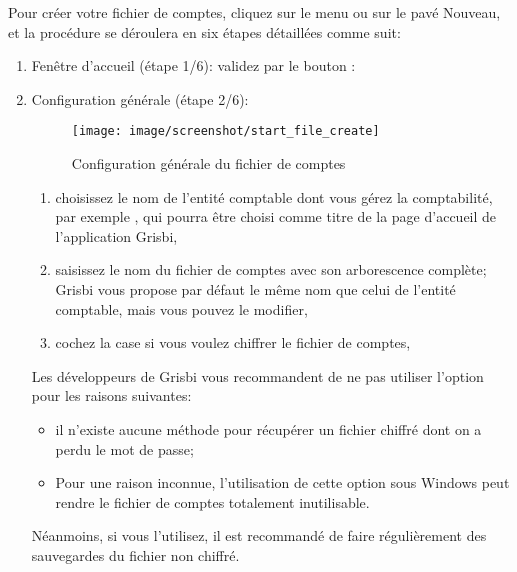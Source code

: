 Pour créer votre fichier de comptes, cliquez sur le menu  ou sur le pavé Nouveau, et la procédure se déroulera en six étapes détaillées comme suit:

\begin{enumerate}
	\item Fenêtre d'accueil (étape 1/6): validez par le bouton :
	\item Configuration
 générale (étape 2/6):

\begin{figure}[htbp]
\begin{center}
\texttt{[image: image/screenshot/start\_file\_create]}
\end{center}
\caption{Configuration générale du fichier de comptes}
\label{start_file_create}
\end{figure}
		
		\begin{enumerate}
		 	\item choisissez le nom de l'entité comptable dont vous gérez la comptabilité, par exemple , qui pourra être choisi comme titre de la page d'accueil de l'application Grisbi,
			\item saisissez le nom du fichier de comptes avec son arborescence complète; Grisbi vous propose par défaut le même nom que celui de l'entité comptable, mais vous pouvez le modifier,
			\item cochez la case  si vous voulez \gls{chiffrer} le fichier de comptes,
			
		\end{enumerate}

Les développeurs de Grisbi vous recommandent de ne pas utiliser l'option  pour les raisons suivantes: 
\begin{itemize}
	\item il n’existe aucune méthode pour récupérer un fichier chiffré dont on a perdu le mot de passe;
	\item Pour une raison inconnue, l’utilisation de cette option sous Windows peut rendre le fichier de comptes totalement inutilisable.
\end{itemize}  
Néanmoins, si vous l'utilisez, il est recommandé de faire régulièrement des sauvegardes du fichier non chiffré.			


\end{enumerate}
